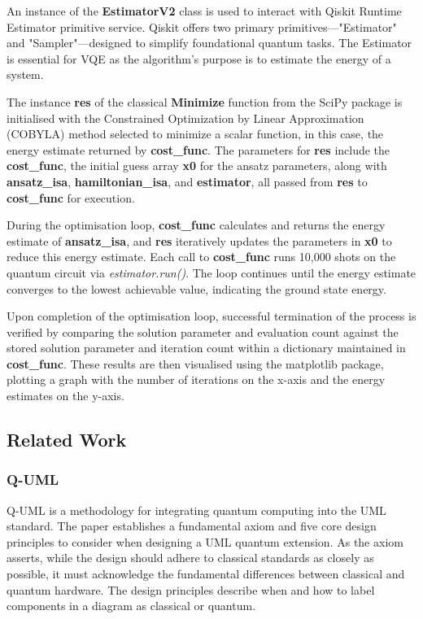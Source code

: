 \documentclass{article}
\begin{document}
An instance of the \textbf{EstimatorV2} class is used to interact with Qiskit Runtime Estimator primitive service\cite{EstimatorV2}. Qiskit offers two primary primitives—"Estimator" and "Sampler"—designed to simplify foundational quantum tasks\cite{QiskitRuntime}. The Estimator is essential for VQE as the algorithm’s purpose is to estimate the energy of a system.

The instance \textbf{res} of the classical \textbf{Minimize} function from the SciPy package is initialised with the Constrained Optimization by Linear Approximation (COBYLA) method selected to minimize a scalar function, in this case, the energy estimate returned by \textbf{cost\_func}.  The parameters for \textbf{res} include the \textbf{cost\_func}, the initial guess array \textbf{x0} for the ansatz parameters, along with \textbf{ansatz\_isa}, \textbf{hamiltonian\_isa}, and \textbf{estimator}, all passed from \textbf{res} to \textbf{cost\_func} for execution. 

During the optimisation loop, \textbf{cost\_func} calculates and returns the energy estimate of \textbf{ansatz\_isa}, and \textbf{res} iteratively updates the parameters in \textbf{x0} to reduce this energy estimate. Each call to \textbf{cost\_func} runs 10,000 shots on the quantum circuit via \textit{estimator.run()}. The loop continues until the energy estimate converges to the lowest achievable value, indicating the ground state energy.

Upon completion of the optimisation loop, successful termination of the process is verified by comparing the solution parameter and evaluation count against the stored solution parameter and iteration count within a dictionary maintained in \textbf{cost\_func}. These results are then visualised using the matplotlib package, plotting a graph with the number of iterations on the x-axis and the energy estimates on the y-axis.

\subsection{Related Work}

\subsubsection{Q-UML}

Q-UML is a methodology for integrating quantum computing into the UML standard. The paper establishes a fundamental axiom and five core design principles to consider when designing a UML quantum extension. As the axiom asserts, while the design should adhere to classical standards as closely as possible, it must acknowledge the fundamental differences between classical and quantum hardware. The design principles describe when and how to label components in a diagram as classical or quantum.
\end{document}
